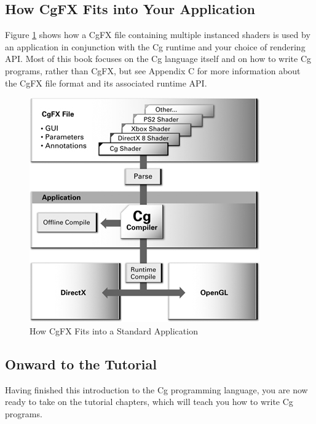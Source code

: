 \documentclass{book}
\begin{document}
\subsection*{How CgFX Fits into Your Application}

Figure \ref{fig:1-15} shows how a CgFX file containing multiple instanced shaders is used by an application in conjunction with the Cg runtime and your choice of rendering API. Most of this book focuses on the Cg language itself and on how to write Cg programs, rather than CgFX, but see Appendix C for more information about the CgFX file format and its associated runtime API.

\begin{figure}
    \centering
    \includegraphics[width=1\linewidth]{Images/fig1_15.jpg}
    \caption{How CgFX Fits into a Standard Application}
    \label{fig:1-15}
\end{figure}

\subsection*{Onward to the Tutorial}

Having finished this introduction to the Cg programming language, you are now ready to take on the tutorial chapters, which will teach you how to write Cg programs.
\end{document}
